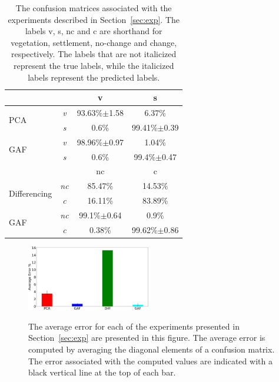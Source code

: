 \documentclass{article}
\begin{document}
\label{sec:results}
\begin{table}
\begin{tabular}{ |l|c c c| }
\hline
& & v & s\\
\hline
\multirow{2}{*}{PCA} & \emph{v} & 93.63\%$\pm$1.58&6.37\%\\
& \emph{s}& 0.6\%& 99.41\%$\pm$0.39\\
\hline
\multirow{2}{*}{GAF} & \emph{v} & 98.96\%$\pm$0.97&1.04\%\\
& \emph{s}& 0.6\%& 99.4\%$\pm$0.47\\
\hline
\hline
& & nc & c\\
\hline
\multirow{2}{*}{Differencing} & \emph{nc} & 85.47\% & 14.53\%\\
& \emph{c}& 16.11\% & 83.89\%\\
\multirow{2}{*}{GAF} & \emph{nc} & 99.1\%$\pm$0.64 & 0.9\%\\
& \emph{c}& 0.38\% & 99.62\%$\pm$0.86\\
\hline
\end{tabular}
\caption{The confusion matrices associated with the experiments described in Section~\ref{sec:exp}. The labels v, s, nc and c are shorthand for vegetation, settlement, no-change and change, respectively. The labels that are not italicized represent the true labels, while the italicized labels represent the predicted labels.}
\label{tab:cm}
\end{table}

\begin{figure}
 \includegraphics[width=0.48\textwidth]{results-crop.pdf}
 \label{fig:results}
 \caption{The average error for each of the experiments presented in Section~\ref{sec:exp} are presented in this figure. The average error is computed by averaging the diagonal elements of a confusion matrix. The error associated with the computed values are indicated with a black vertical line at the top of each bar.}
\label{fig:results} 
\end{figure}
\end{document}
